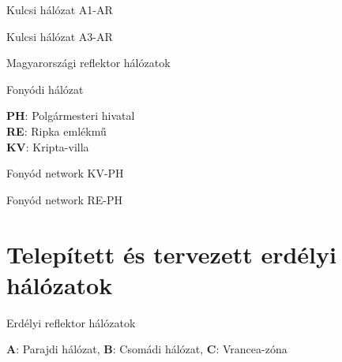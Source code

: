 \documentclass[aspectratio=169]{beamer}
\begin{document}


\begin{frame}{Kulcsi hálózat A1-AR}
\end{frame}


\begin{frame}{Kulcsi hálózat A3-AR}
\end{frame}


\begin{frame}{Magyarországi reflektor hálózatok}
    \begin{minipage}[c]{0.6\textwidth}
        \centering
        \fonyod

        Fonyódi hálózat
    \end{minipage}
    \hspace{5pt}
    \begin{minipage}[c]{0.3\textwidth}
            \textbf{PH}: Polgármesteri hivatal\\
            \textbf{RE}: Ripka emlékmű\\
            \textbf{KV}: Kripta-villa
    \end{minipage}
\end{frame}



\begin{frame}{Fonyód network KV-PH}
\end{frame}

\begin{frame}{Fonyód network RE-PH}
\end{frame}



\section{Telepített és tervezett erdélyi hálózatok}


\begin{frame}{Erdélyi reflektor hálózatok}
    \centering
    \begin{minipage}[c]{0.65\textwidth}
        \erdely
        \begin{center}
            \textbf{A}: Parajdi hálózat, 
            \textbf{B}: Csomádi hálózat, 
            \textbf{C}: Vrancea-zóna
        \end{center}
    \end{minipage}
\end{frame}
\end{document}
